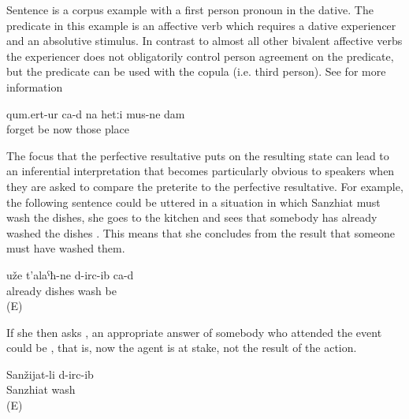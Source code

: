 Sentence  is a corpus example with a first person pronoun in the dative. The predicate in this example is an affective verb which requires a dative experiencer and an absolutive stimulus. In contrast to almost all other bivalent affective verbs the experiencer does not obligatorily control person agreement on the predicate, but the predicate can be used with the copula (i.e. third person). See  for more information

\begin{exe}
	\ex	\label{ex:Now I have forgotten those places analytic}
	\gll	qum.ert-ur ca-d	na	hetːi	mus-ne	dam\\
		forget be	now	those	place	\\
	\glt	{}
\end{exe}


The focus that the perfective resultative puts on the resulting state can lead to an inferential interpretation that becomes particularly obvious to speakers when they are asked to compare the preterite to the perfective resultative. For example, the following sentence could be uttered in a situation in which Sanzhiat must wash the dishes, she goes to the kitchen and sees that somebody has already washed the dishes . This means that she concludes from the result that someone must have washed them.
%
\begin{exe}
	\ex	\label{ex:The dishes have already been washed}
	\gll	uže	t'alaˁħ-ne	d-irc-ib	ca-d\\
		already	dishes	wash	be\\
	\glt	{} (E)
\end{exe}

If she then asks  , an appropriate answer of somebody who attended the event could be , that is, now the agent is at stake, not the result of the action.
%
\begin{exe}
	\ex	\label{ex:Sanzhiat washed (them)}
	\gll	Sanžijat-li	d-irc-ib\\
		Sanzhiat	wash\\
	\glt	{} (E)
\end{exe}

